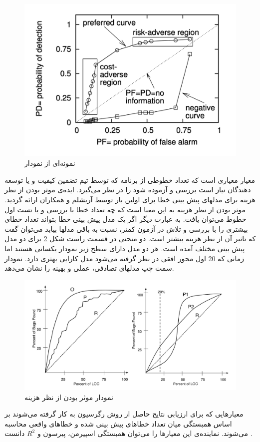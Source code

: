\begin{figure}[H]
	\centering
	\includegraphics[width=.5\textwidth]{images/ROC.PNG}
	\caption{ نمونه‌ای از نمودار  \cite{menzies2007data}}
	\label{fig:ROC}
\end{figure}

معیار  معیاری است که تعداد خطوطی از برنامه که  توسط تیم تضمین کیفیت و یا توسعه دهندگان نیاز است بررسی و آزموده شود را در نظر می‌گیرد. ایده‌ی  موثر بودن از نظر هزینه 
برای مدلهای پیش بینی خطا برای اولین بار توسط آریشلم و همکاران \cite{arisholm2007data} ارائه گردید. موثر بودن از نظر هزینه به این معنا است که چه تعداد خطا با بررسی و یا تست   اول خطوط می‌توان یافت. به عبارت دیگر اگر یک مدل پیش بینی خطا بتواند تعداد خطای بیشتری را با بررسی و تلاش در آزمون کمتر، نسبت به باقی مدلها بیابد می‌توان گفت که تاثیر آن از نظر هزینه بیشتر است. دو منحنی در  قسمت راست شکل \ref{fig:AUCEC} برای دو مدل پیش بینی مختلف آمده است. هر دو مدل دارای سطح زیر نمودار یکسانی هستند اما زمانی که 20\lr{\%}  اول محور افقی در نظر گرفته می‌شود مدل 
  کارایی بهتری دارد. نمودار سمت چپ مدلهای تصادفی، عملی  و بهینه را نشان می‌دهد.

\begin{figure}[H]
	\centering
	\includegraphics[width=.7\textwidth]{images/AUCEC.PNG}
	\caption{ نمودار موثر بودن از نظر هزینه \cite{rahman2011bugcache}}
	\label{fig:AUCEC}
\end{figure}

معیارهایی که برای ارزیابی نتایج حاصل از روش رگرسیون به کار گرفته می‌شوند بر اساس همبستگی  میان تعداد خطاهای پیش بینی شده و خطاهای واقعی محاسبه می‌شوند. نماینده‌ی این معیارها را می‌توان همبستگی اسپیرمن، پیرسون و $ R^2$ دانست \cite{nam2014survey}. 